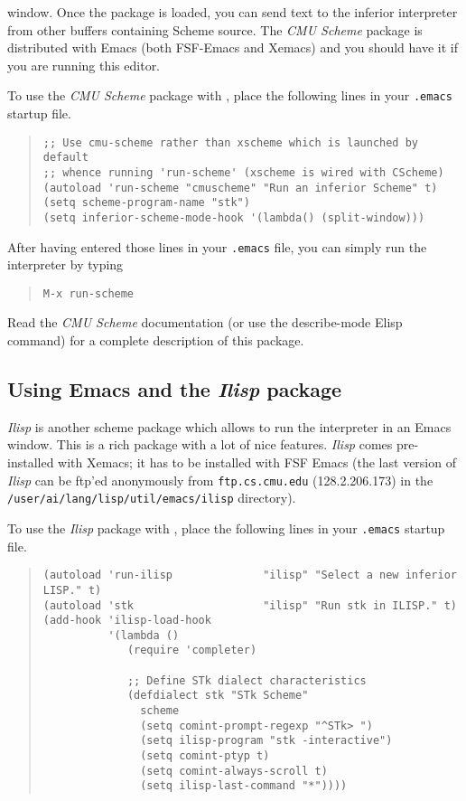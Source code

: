 window. Once the package is loaded, you can send  text to the inferior
{\stk} interpreter from other buffers containing Scheme source. 
The {\em CMU Scheme} package is distributed with Emacs (both FSF-Emacs and
Xemacs) and you should have it if you are running this editor.

To use the {\em CMU Scheme} package with {\stk}, place the following lines in
your {\tt .emacs} startup file.

\begin{quote}
\begin{verbatim}
;; Use cmu-scheme rather than xscheme which is launched by default
;; whence running 'run-scheme' (xscheme is wired with CScheme)
(autoload 'run-scheme "cmuscheme" "Run an inferior Scheme" t)
(setq scheme-program-name "stk")
(setq inferior-scheme-mode-hook '(lambda() (split-window)))
\end{verbatim}
\end{quote}


After having entered those lines in your {\tt .emacs} file, you can simply
run the {\stk} interpreter by typing
\begin{quote}
\begin{verbatim}
M-x run-scheme
\end{verbatim}
\end{quote}


Read the {\em CMU Scheme} documentation (or use the describe-mode Elisp command)
for a complete description of this package.

\subsection*{Using Emacs and the {\em Ilisp} package}

{\em Ilisp} is another scheme package which allows to
run the {\stk} interpreter in an Emacs window. This is a rich package with
a lot of nice features.  {\em Ilisp} comes pre-installed with Xemacs; it
has to be installed with FSF Emacs (the last version of {\em Ilisp} can be
ftp'ed anonymously from {\tt ftp.cs.cmu.edu} (128.2.206.173) in the {\tt
/user/ai/lang/lisp/util/emacs/ilisp} directory).

To use the {\em Ilisp} package with {\stk}, place the following lines in
your {\tt .emacs} startup file.


\begin{quote}
\begin{verbatim}
(autoload 'run-ilisp              "ilisp" "Select a new inferior LISP." t)
(autoload 'stk                    "ilisp" "Run stk in ILISP." t)
(add-hook 'ilisp-load-hook
          '(lambda ()
             (require 'completer)

             ;; Define STk dialect characteristics
             (defdialect stk "STk Scheme"
               scheme
               (setq comint-prompt-regexp "^STk> ")
               (setq ilisp-program "stk -interactive")
               (setq comint-ptyp t)
               (setq comint-always-scroll t)
               (setq ilisp-last-command "*"))))
\end{verbatim}
\end{quote}


